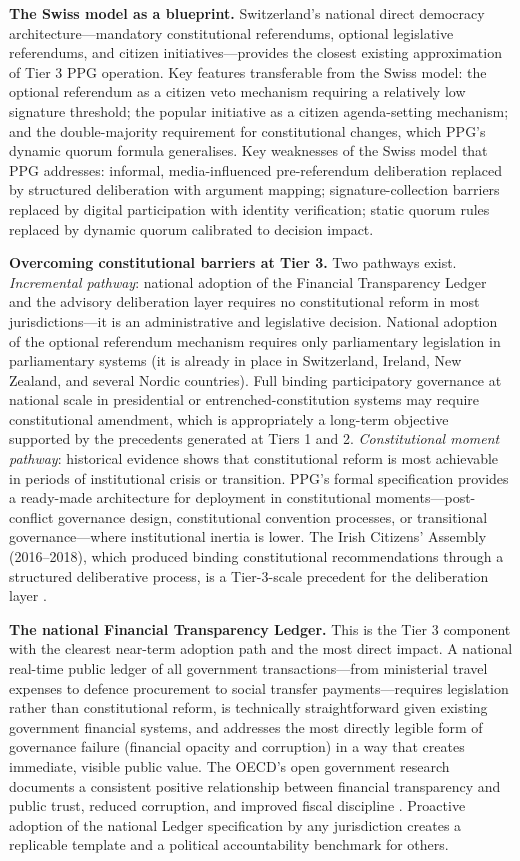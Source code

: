 \documentclass[12pt,a4paper,oneside]{report}
\begin{document}
\textbf{The Swiss model as a blueprint.} Switzerland's national direct democracy architecture---mandatory constitutional referendums, optional legislative referendums, and citizen initiatives---provides the closest existing approximation of Tier 3 PPG operation. Key features transferable from the Swiss model: the optional referendum as a citizen veto mechanism requiring a relatively low signature threshold; the popular initiative as a citizen agenda-setting mechanism; and the double-majority requirement for constitutional changes, which PPG's dynamic quorum formula generalises. Key weaknesses of the Swiss model that PPG addresses: informal, media-influenced pre-referendum deliberation replaced by structured deliberation with argument mapping; signature-collection barriers replaced by digital participation with identity verification; static quorum rules replaced by dynamic quorum calibrated to decision impact.

\textbf{Overcoming constitutional barriers at Tier 3.} Two pathways exist. \emph{Incremental pathway}: national adoption of the Financial Transparency Ledger and the advisory deliberation layer requires no constitutional reform in most jurisdictions---it is an administrative and legislative decision. National adoption of the optional referendum mechanism requires only parliamentary legislation in parliamentary systems (it is already in place in Switzerland, Ireland, New Zealand, and several Nordic countries). Full binding participatory governance at national scale in presidential or entrenched-constitution systems may require constitutional amendment, which is appropriately a long-term objective supported by the precedents generated at Tiers 1 and 2. \emph{Constitutional moment pathway}: historical evidence shows that constitutional reform is most achievable in periods of institutional crisis or transition. PPG's formal specification provides a ready-made architecture for deployment in constitutional moments---post-conflict governance design, constitutional convention processes, or transitional governance---where institutional inertia is lower. The Irish Citizens' Assembly (2016--2018), which produced binding constitutional recommendations through a structured deliberative process, is a Tier-3-scale precedent for the deliberation layer \citep{farrell2019remaking}.

\textbf{The national Financial Transparency Ledger.} This is the Tier 3 component with the clearest near-term adoption path and the most direct impact. A national real-time public ledger of all government transactions---from ministerial travel expenses to defence procurement to social transfer payments---requires legislation rather than constitutional reform, is technically straightforward given existing government financial systems, and addresses the most directly legible form of governance failure (financial opacity and corruption) in a way that creates immediate, visible public value. The OECD's open government research documents a consistent positive relationship between financial transparency and public trust, reduced corruption, and improved fiscal discipline \citep{oecd2020open}. Proactive adoption of the national Ledger specification by any jurisdiction creates a replicable template and a political accountability benchmark for others.
\end{document}

